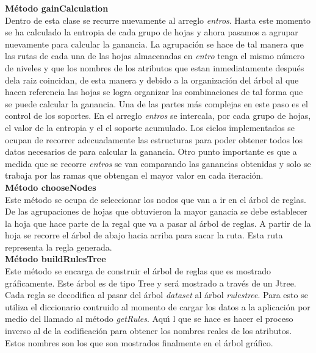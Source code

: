 \textbf{M\'etodo gainCalculation}\\
Dentro de esta clase se recurre nuevamente al arreglo \textit{entros}. Hasta este momento se ha calculado la
entropia de cada grupo de hojas y ahora pasamos a agrupar nuevamente para calcular la ganancia.  La agrupaci\'on
se hace de tal manera que las rutas de cada una de las hojas almacenadas en \textit{entro} tenga el mismo n\'umero
de niveles y que los nombres de los atributos que estan inmediatamente despu\'es dela raiz coincidan, de esta
manera y debido a la organizaci\'on del \'arbol al que hacen referencia las hojas se logra organizar las
combinaciones de tal forma que se puede calcular la ganancia. Una de las partes m\'as complejas en este paso es el
control de los soportes. En el arreglo \textit{entros} se intercala, por cada grupo de hojas, el valor de la
entropia y el el soporte acumulado. Los ciclos implementados se ocupan de recorrer adecuadamente las estructuras
para poder obtener todos los datos necesarios de para calcular la ganancia. Otro punto importante es que a medida
que se recorre \textit{entros} se van comparando las ganancias obtenidas y solo se trabaja por las ramas que
obtengan el mayor valor en cada iteraci\'on.\\

\textbf{M\'etodo chooseNodes}\\
Este m\'etodo se ocupa de seleccionar los nodos que van a ir en el \'arbol de reglas. De las agrupaciones de hojas
que obtuvieron la mayor ganacia se debe establecer la hoja que hace parte de la regal que va a pasar al \'arbol de
reglas. A partir de la hoja se recorre el \'arbol de abajo hacia arriba para sacar la ruta. Esta ruta representa
la regla generada.\\

\textbf{M\'etodo buildRulesTree}\\
Este m\'etodo se encarga de construir el \'arbol de reglas que es mostrado gr\'aficamente. Este \'arbol es de tipo
Tree y ser\'a mostrado a trav\'es de un Jtree. Cada regla se decodifica al pasar del \'arbol \textit{dataset} al
\'arbol \textit{rulestree}. Para esto se utiliza el diccionario contruido al momento de cargar los datos a la
aplicaci\'on por medio del llamado al m\'etodo \textit{getRules}. Aqu\'\i{} l que se hace es hacer el proceso
inverso al de la codificaci\'on para obtener los nombres reales de los atributos. Estos nombres son los que son
mostrados finalmente en el \'arbol gr\'afico.\\ \\

